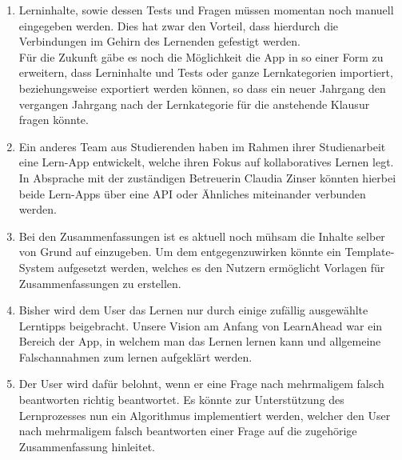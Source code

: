 \begin{enumerate}
    \item Lerninhalte, sowie dessen Tests und Fragen müssen momentan noch manuell eingegeben werden. Dies hat zwar den Vorteil, dass hierdurch die Verbindungen im Gehirn des Lernenden gefestigt werden.\\
    
    \noindent
    Für die Zukunft gäbe es noch die Möglichkeit die App in so einer Form zu erweitern, dass Lerninhalte und Tests oder ganze Lernkategorien importiert, beziehungsweise exportiert werden können, so dass ein neuer Jahrgang den vergangen Jahrgang nach der Lernkategorie für die anstehende Klausur fragen könnte.
    \item Ein anderes Team aus Studierenden haben im Rahmen ihrer Studienarbeit eine Lern-App entwickelt, welche ihren Fokus auf kollaboratives Lernen legt. In Absprache mit der zuständigen Betreuerin Claudia Zinser könnten hierbei beide Lern-Apps über eine API oder Ähnliches miteinander verbunden werden.
    \item Bei den Zusammenfassungen ist es aktuell noch mühsam die Inhalte selber von Grund auf einzugeben. Um dem entgegenzuwirken könnte ein Template-System aufgesetzt werden, welches es den Nutzern ermöglicht Vorlagen für Zusammenfassungen zu erstellen.
    \item Bisher wird dem User das Lernen nur durch einige zufällig ausgewählte Lerntipps beigebracht. Unsere Vision am Anfang von LearnAhead war ein Bereich der App, in welchem man das Lernen lernen kann und allgemeine Falschannahmen zum lernen aufgeklärt werden.
    \item Der User wird dafür belohnt, wenn er eine Frage nach mehrmaligem falsch beantworten richtig beantwortet. Es könnte zur Unterstützung des Lernprozesses nun ein Algorithmus implementiert werden, welcher den User nach mehrmaligem falsch beantworten einer Frage auf die zugehörige Zusammenfassung hinleitet.\\


\end{enumerate}
